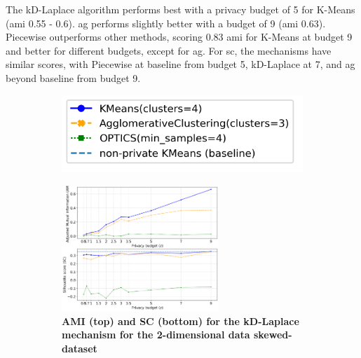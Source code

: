 \begin{figure}[H]
\begin{subfigure}{1\textwidth}
      \end{subfigure}
      \label{fig:validation-line-dataset_comparison_2d-laplace}
\end{figure}
The kD-Laplace algorithm performs best with a privacy budget of 5 for K-Means (\gls{ami} 0.55 - 0.6).
\gls{ag} performs slightly better with a budget of 9 (\gls{ami} 0.63).
Piecewise outperforms other methods, scoring 0.83 \gls{ami} for K-Means at budget 9 and better for different budgets, except for \gls{ag}.
For \gls{sc}, the mechanisms have similar scores, with Piecewise at baseline from budget 5, kD-Laplace at 7, and \gls{ag} beyond baseline from budget 9.

\newpage
\begin{figure}[H]
      \centering
      \begin{subfigure}{0.3\textwidth}
            \includegraphics[width=\textwidth]{Results/kd-laplace/kd-Laplace/skewed-dataset/legend_2.png}
      \end{subfigure}
      \begin{subfigure}{1\textwidth}
            \centering
            \caption{\textbf{AMI (top) and SC (bottom) for the kD-Laplace mechanism for the 2-dimensional data skewed-dataset}}
            \includegraphics[width=0.65\textwidth]{Results/kd-laplace/kd-Laplace/skewed-dataset/ami-and-sc_2_dimensions.png}
            \centering
      \end{subfigure}
      \begin{subfigure}{1\textwidth}

\end{subfigure}
\end{figure}
